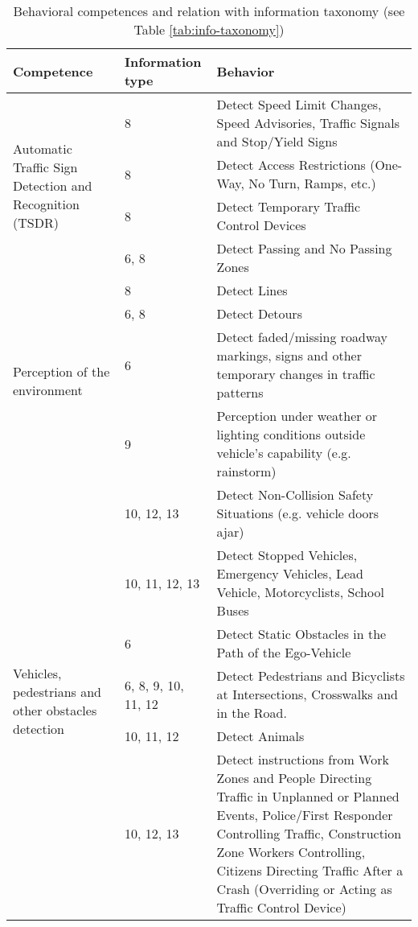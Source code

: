 \begin{table*}[t] %
    \caption{Behavioral competences and relation with information taxonomy 
        (see Table \ref{tab:info-taxonomy})}
    \label{tab:behavioral-competences}
    \begin{tabular*}{\textwidth}{m{4cm} l p{11cm}}%
        \hline %
        \textbf{Competence}	& \textbf{Information type} & \textbf{Behavior}	
        \\
        \hline %
        \multirow{4}{4cm}{Automatic Traffic Sign Detection
            and Recognition (TSDR)}
        & 8    & Detect Speed Limit Changes, Speed Advisories, Traffic Signals 
        and Stop/Yield Signs \\
        & 8    & Detect Access Restrictions (One-Way, No Turn, Ramps, etc.) \\
        & 8    & Detect Temporary Traffic Control Devices \\
        & 6, 8 & Detect Passing and No Passing Zones  \\
        \hline %
        \multirow{4}{*}{Perception of the environment}
        & 8 & Detect Lines \\
        & 6, 8 & Detect Detours  \\
        & 6 & Detect faded/missing roadway markings, signs and other 
        temporary changes in traffic patterns \\
        & 9 & Perception under weather or lighting conditions 
        outside 
        vehicle’s capability (e.g. rainstorm) \\
        \hline %
        \multirow{6}{4cm}{Vehicles, pedestrians and other obstacles 
            detection}
        & 10, 12, 13 & Detect Non-Collision Safety Situations (e.g. vehicle 
        doors ajar) \\
        & 10, 11, 12, 13 & Detect Stopped Vehicles, Emergency Vehicles, Lead 
        Vehicle, Motorcyclists, School Buses \\
        & 6  & Detect Static Obstacles in the Path of the Ego-Vehicle \\
        & 6, 8, 9, 10, 11, 12 & Detect Pedestrians and Bicyclists at 
        Intersections, Crosswalks and in the Road. \\
        & 10, 11, 12 & Detect Animals \\
        & 10, 12, 13 & Detect instructions from Work Zones and People 
        Directing Traffic in Unplanned or Planned Events, Police/First 
        Responder Controlling Traffic, Construction Zone Workers Controlling, 
        Citizens Directing Traffic After a Crash (Overriding or Acting as 
        Traffic Control Device) \\
        
        \hline %
    \end{tabular*}
\end{table*}

